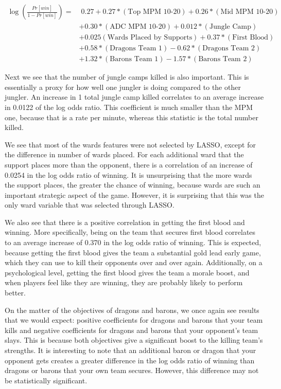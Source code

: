 \documentclass[runningheads]{llncs}
\begin{document}
	\begin{align*}
		\log \left( \frac{Pr[win]}{1 - Pr[win]} \right) =&\; 0.27 + 0.27 * (\text{Top MPM 10-20}) + 0.26 * (\text{Mid MPM 10-20}) \\
		& + 0.30 * (\text{ADC MPM 10-20}) + 0.012 * (\text{Jungle Camp}) \\
		& + 0.025 (\text{Wards Placed by Supports}) + 0.37 * (\text{First Blood}) \\
		& + 0.58 * (\text{Dragons Team 1}) - 0.62 * (\text{Dragons Team 2}) \\
		& + 1.32 * (\text{Barons Team 1}) - 1.57 * (\text{Barons Team 2})
	\end{align*}
	
	Next we see that the number of jungle camps killed is also important. This is essentially a proxy for how well one jungler is doing compared to the other jungler. An increase in 1 total jungle camp killed correlates to an average increase in 0.0122 of the log odds ratio. This coefficient is much smaller than the MPM one, because that is a rate per minute, whereas this statistic is the total number killed.

	We see that most of the wards features were not selected by LASSO, except for the difference in number of wards placed. For each additional ward that the support places more than the opponent, there is a correlation of an increase of 0.0254 in the log odds ratio of winning. It is unsurprising that the more wards the support places, the greater the chance of winning, because wards are such an important strategic aspect of the game. However, it is surprising that this was the only ward variable that was selected through LASSO.

	We also see that there is a positive correlation in getting the first blood and winning. More specifically, being on the team that secures first blood correlates to an average increase of 0.370 in the log odds ratio of winning. This is expected, because getting the first blood gives the team a substantial gold lead early game, which they can use to kill their opponents over and over again. Additionally, on a psychological level, getting the first blood gives the team a morale boost, and when players feel like they are winning, they are probably likely to perform better.

	On the matter of the objectives of dragons and barons, we once again see results that we would expect: positive coefficients for dragons and barons that your team kills and negative coefficients for dragons and barons that your opponent’s team slays. This is because both objectives give a significant boost to the killing team’s strengths. It is interesting to note that an additional baron or dragon that your opponent gets creates a greater difference in the log odds ratio of winning than dragons or barons that your own team secures. However, this difference may not be statistically significant.
\end{document}
